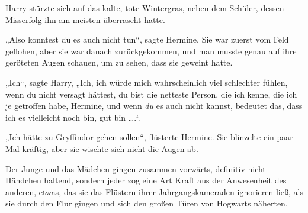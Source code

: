 Harry stürzte sich auf das kalte, tote Wintergras, neben dem Schüler, dessen Misserfolg ihn am meisten überrascht hatte.

„Also konntest du es auch nicht tun“, sagte Hermine. Sie war zuerst vom Feld geflohen, aber sie war danach zurückgekommen, und man musste genau auf ihre geröteten Augen schauen, um zu sehen, dass sie geweint hatte.

„Ich“, sagte Harry,
„Ich, ich würde mich wahrscheinlich viel schlechter fühlen, wenn du nicht versagt hättest, du bist die netteste Person, die ich kenne, die ich je getroffen habe, Hermine, und wenn \emph{du} es auch nicht kannst, bedeutet das, dass ich es vielleicht noch bin, gut bin ….“.

„Ich hätte zu Gryffindor gehen sollen“, flüsterte Hermine. Sie blinzelte ein paar Mal kräftig, aber sie wischte sich nicht die Augen ab.

\later

Der Junge und das Mädchen gingen zusammen vorwärts, definitiv nicht Händchen haltend, sondern jeder zog eine Art Kraft aus der Anwesenheit des anderen, etwas, das sie das Flüstern ihrer Jahrgangskameraden ignorieren ließ, als sie durch den Flur gingen und sich den großen Türen von Hogwarts näherten.

